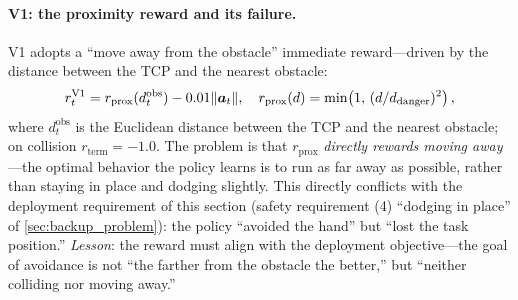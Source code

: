 \paragraph{V1: the proximity reward and its failure.} V1 adopts a ``move away from the obstacle'' immediate reward---driven by the distance between the TCP and the nearest obstacle:
\begin{equation*}
  r_t^{\text{V1}} = r_{\text{prox}}(d_t^{\text{obs}}) - 0.01 \lVert \bm{a}_t \rVert,\quad
  r_{\text{prox}}(d) = \min\!\left(1, \, (d / d_{\text{danger}})^2\right),
\end{equation*}
where $d_t^{\text{obs}}$ is the Euclidean distance between the TCP and the nearest obstacle; on collision $r_{\text{term}} = -1.0$. The problem is that $r_{\text{prox}}$ \emph{directly rewards moving away}---the optimal behavior the policy learns is to run as far away as possible, rather than staying in place and dodging slightly. This directly conflicts with the deployment requirement of this section (safety requirement (4) ``dodging in place'' of \cref{sec:backup_problem}): the policy ``avoided the hand'' but ``lost the task position.'' \emph{Lesson}: the reward must align with the deployment objective---the goal of avoidance is not ``the farther from the obstacle the better,'' but ``neither colliding nor moving away.''

